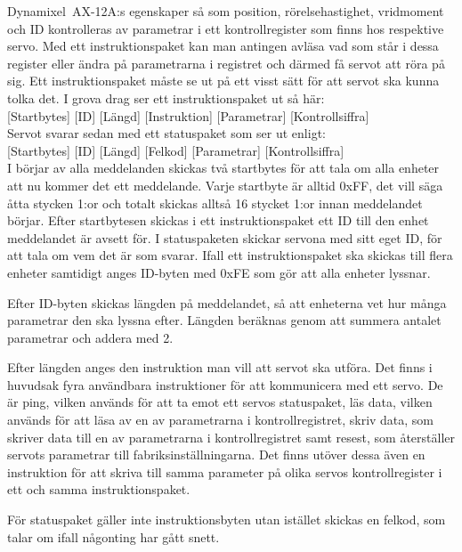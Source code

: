 \documentclass[a4paper,12pt]{article}
\begin{document}
Dynamixel~AX-12A:s egenskaper så som position, rörelsehastighet, vridmoment och ID kontrolleras av parametrar i ett kontrollregister som finns hos respektive servo. Med ett instruktionspaket kan man antingen avläsa vad som står i dessa register eller ändra på parametrarna i registret och därmed få servot att röra på sig. Ett instruktionspaket måste se ut på ett visst sätt för att servot ska kunna tolka det. I grova drag ser ett instruktionspaket ut så här:\\

[Startbytes] [ID] [Längd] [Instruktion] [Parametrar] [Kontrollsiffra]\\

Servot svarar sedan med ett statuspaket som ser ut enligt:\\

[Startbytes] [ID] [Längd] [Felkod] [Parametrar] [Kontrollsiffra]\\

I börjar av alla meddelanden skickas två startbytes för att tala om alla enheter att nu kommer det ett meddelande. Varje startbyte är alltid 0xFF, det vill säga åtta stycken 1:or och totalt skickas alltså 16 stycket 1:or innan meddelandet börjar. Efter startbytesen skickas i ett instruktionspaket ett ID till den enhet meddelandet är avsett för. I statuspaketen skickar servona med sitt eget ID, för att tala om vem det är som svarar. Ifall ett instruktionspaket ska skickas till flera enheter samtidigt anges ID-byten med 0xFE som gör att alla enheter lyssnar. 

Efter ID-byten skickas längden på meddelandet, så att enheterna vet hur många parametrar den ska lyssna efter. Längden beräknas genom att summera antalet parametrar och addera med 2.

Efter längden anges den instruktion man vill att servot ska utföra. Det finns i huvudsak fyra användbara instruktioner för att kommunicera med ett servo. De är ping, vilken används för att ta emot ett servos statuspaket, läs data, vilken används för att läsa av en av parametrarna i kontrollregistret, skriv data, som skriver data till en av parametrarna i kontrollregistret samt resest, som återställer servots parametrar till fabriksinställningarna. Det finns utöver dessa även en instruktion för att skriva till samma parameter på olika servos kontrollregister i ett och samma instruktionspaket. 

För statuspaket gäller inte instruktionsbyten utan istället skickas en felkod, som talar om ifall någonting har gått snett.
\end{document}
